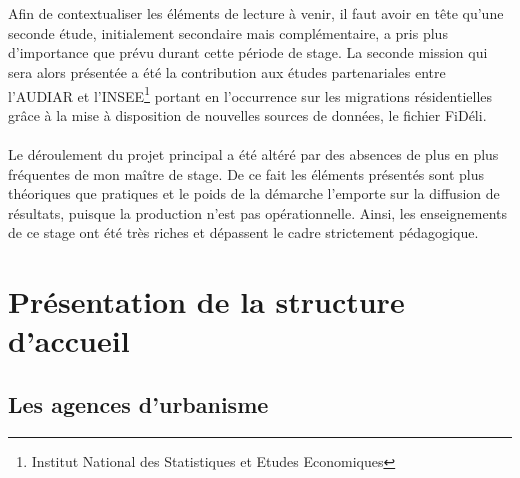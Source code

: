 \documentclass{bredele}
\begin{document}
\\\\
Afin de contextualiser les éléments de lecture à venir, il faut avoir en tête qu’une seconde étude, initialement secondaire mais complémentaire, a pris plus d’importance que prévu durant cette période de stage. La seconde mission qui sera alors présentée a été la contribution aux études partenariales entre l’AUDIAR et l’INSEE\footnote{Institut National des Statistiques et Etudes Economiques} portant en l’occurrence sur les migrations résidentielles grâce à la mise à disposition de nouvelles sources de données, le fichier FiDéli.
\\\\
Le déroulement du projet principal a été altéré par des absences de plus en plus fréquentes de mon maître de stage. De ce fait les éléments présentés sont plus théoriques que pratiques et le poids de la démarche l’emporte sur la diffusion de résultats, puisque la production n'est pas opérationnelle. Ainsi, les enseignements de ce stage ont été très riches et dépassent le cadre strictement pédagogique.
\clearemptydoublepage
{}
\clearemptydoublepage
\mainmatter %
\part[Structure d'accueil]{Présentation de la structure d'accueil}
\chapter[Les agences d'urbanisme]{Les agences d'urbanisme}
\end{document}
